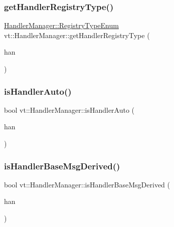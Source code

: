 \subsubsection{\texorpdfstring{get\+Handler\+Registry\+Type()}{getHandlerRegistryType()}}
{\footnotesize\ttfamily \hyperlink{namespacevt_1_1auto__registry_a9f369ca2b484130b396729e2ddf05241}{Handler\+Manager\+::\+Registry\+Type\+Enum} vt\+::\+Handler\+Manager\+::get\+Handler\+Registry\+Type (\begin{DoxyParamCaption}\item[{\hyperlink{namespacevt_af64846b57dfcaf104da3ef6967917573}{Handler\+Type}}]{han }\end{DoxyParamCaption})\hspace{0.3cm}{\ttfamily [static]}}

\mbox{\label{structvt_1_1_handler_manager_a3324aeb71747bdd6b99194674dc03434}} 
\subsubsection{\texorpdfstring{is\+Handler\+Auto()}{isHandlerAuto()}}
{\footnotesize\ttfamily bool vt\+::\+Handler\+Manager\+::is\+Handler\+Auto (\begin{DoxyParamCaption}\item[{\hyperlink{namespacevt_af64846b57dfcaf104da3ef6967917573}{Handler\+Type}}]{han }\end{DoxyParamCaption})\hspace{0.3cm}{\ttfamily [static]}}

\mbox{\label{structvt_1_1_handler_manager_a88c108df63f4d16a17485c08eefe31c5}} 
\subsubsection{\texorpdfstring{is\+Handler\+Base\+Msg\+Derived()}{isHandlerBaseMsgDerived()}}
{\footnotesize\ttfamily bool vt\+::\+Handler\+Manager\+::is\+Handler\+Base\+Msg\+Derived (\begin{DoxyParamCaption}\item[{\hyperlink{namespacevt_af64846b57dfcaf104da3ef6967917573}{Handler\+Type}}]{han }\end{DoxyParamCaption})\hspace{0.3cm}{\ttfamily [static]}}

